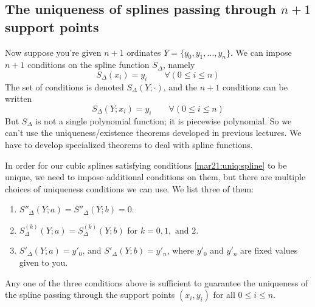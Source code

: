 \subsection{The uniqueness of splines passing through $n+1$ support points}

Now suppose you're given $n+1$ ordinates $Y = \{y_0, y_1, \dots ,y_n \}$. We can impose $n+1$ conditions on the spline function $S_\Delta$, namely
\[
  S_\Delta(x_i) = y_i \qquad \forall(0 \leq i \leq n)
\]
The set of conditions is denoted $S_\Delta(Y ; \cdot)$, and the $n+1$ conditions can be written
\begin{equation}
  \label{mar21:uniq:spline}
  S_\Delta(Y ; x_i) = y_i \qquad \forall(0 \leq i \leq n)
\end{equation}
But $S_\Delta$ is not a single polynomial function; it is piecewise polynomial. So we can't use the uniqueness/existence theorems developed in previous lectures. We have to develop specialized theorems to deal with spline functions.

In order for our cubic splines satisfying conditions \ref{mar21:uniq:spline} to be unique, we need to impose additional conditions on them, but there are multiple choices of uniqueness conditions we can use. We list three of them:

\begin{enumerate}[label = \arabic*)]
\item
  $S''_\Delta(Y ; a) = S''_\Delta(Y ; b) = 0$.
\item
  $S^{(k)}_\Delta(Y ; a) = S^{(k)}_\Delta(Y ; b)$ for $k = 0, 1, \text{ and } 2$.
\item
  $S'_\Delta(Y ; a) = y'_0$, and $S'_\Delta(Y ; b) = y'_n$, where $y'_0$ and $y'_n$ are fixed values given to you.
\end{enumerate}

Any one of the three conditions above is sufficient to guarantee the uniqueness of the spline passing through the support points $(x_i, y_i)$ for all $0 \leq i \leq n$.

